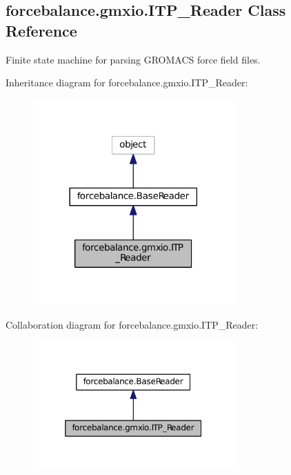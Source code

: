 \hypertarget{classforcebalance_1_1gmxio_1_1ITP__Reader}{\subsection{forcebalance.\-gmxio.\-I\-T\-P\-\_\-\-Reader Class Reference}
\label{classforcebalance_1_1gmxio_1_1ITP__Reader}
}


Finite state machine for parsing G\-R\-O\-M\-A\-C\-S force field files.  




Inheritance diagram for forcebalance.\-gmxio.\-I\-T\-P\-\_\-\-Reader\-:
\nopagebreak
\begin{figure}[H]
\begin{center}
\leavevmode
\includegraphics[width=218pt]{classforcebalance_1_1gmxio_1_1ITP__Reader__inherit__graph}
\end{center}
\end{figure}


Collaboration diagram for forcebalance.\-gmxio.\-I\-T\-P\-\_\-\-Reader\-:
\nopagebreak
\begin{figure}[H]
\begin{center}
\leavevmode
\includegraphics[width=218pt]{classforcebalance_1_1gmxio_1_1ITP__Reader__coll__graph}
\end{center}
\end{figure}
